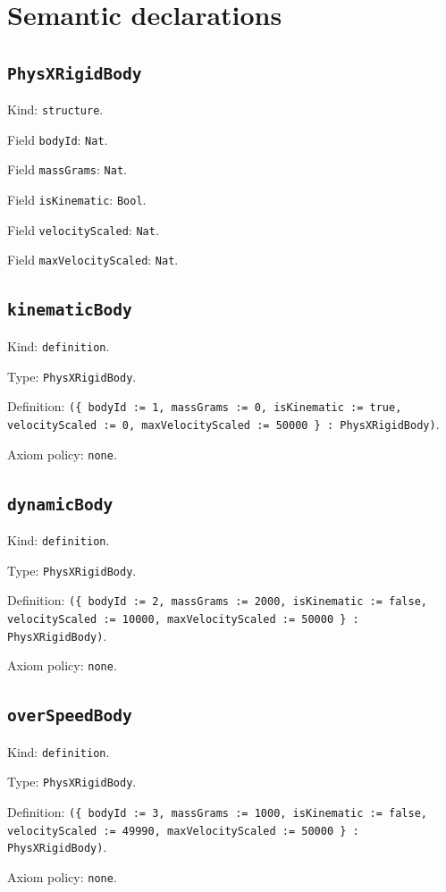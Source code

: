 \documentclass[11pt]{article}
\begin{document}
\section*{Semantic declarations}
\subsection*{\texttt{PhysXRigidBody}}
\noindent Kind: \texttt{structure}.\par
\noindent Field \texttt{bodyId}: \texttt{Nat}.\par
\noindent Field \texttt{massGrams}: \texttt{Nat}.\par
\noindent Field \texttt{isKinematic}: \texttt{Bool}.\par
\noindent Field \texttt{velocityScaled}: \texttt{Nat}.\par
\noindent Field \texttt{maxVelocityScaled}: \texttt{Nat}.\par
\subsection*{\texttt{kinematicBody}}
\noindent Kind: \texttt{definition}.\par
\noindent Type: \texttt{PhysXRigidBody}.\par
\noindent Definition: \texttt{(\{ bodyId := 1, massGrams := 0, isKinematic := true, velocityScaled := 0, maxVelocityScaled := 50000 \} : PhysXRigidBody)}.\par
\noindent Axiom policy: \texttt{none}.\par
\subsection*{\texttt{dynamicBody}}
\noindent Kind: \texttt{definition}.\par
\noindent Type: \texttt{PhysXRigidBody}.\par
\noindent Definition: \texttt{(\{ bodyId := 2, massGrams := 2000, isKinematic := false, velocityScaled := 10000, maxVelocityScaled := 50000 \} : PhysXRigidBody)}.\par
\noindent Axiom policy: \texttt{none}.\par
\subsection*{\texttt{overSpeedBody}}
\noindent Kind: \texttt{definition}.\par
\noindent Type: \texttt{PhysXRigidBody}.\par
\noindent Definition: \texttt{(\{ bodyId := 3, massGrams := 1000, isKinematic := false, velocityScaled := 49990, maxVelocityScaled := 50000 \} : PhysXRigidBody)}.\par
\noindent Axiom policy: \texttt{none}.\par
\end{document}
